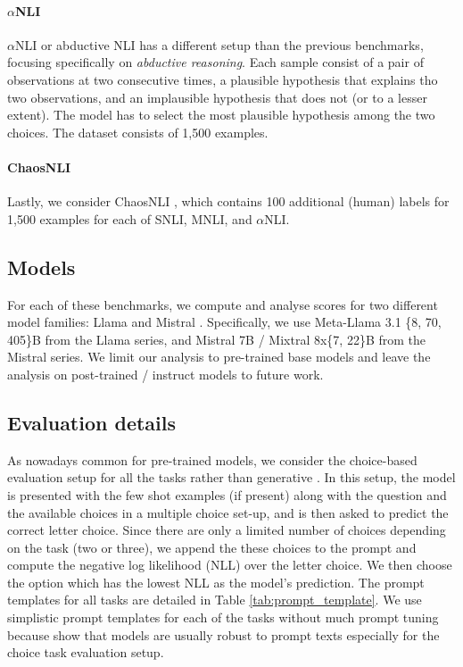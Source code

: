 \vspace{-1mm}
\paragraph{$\alpha$NLI}
$\alpha$NLI or abductive NLI \citep{bhagavatula2020abductive} has a different setup than the previous benchmarks, focusing specifically on \emph{abductive reasoning}.
Each sample consist of a pair of observations at two consecutive times, a plausible hypothesis that explains tho two observations, and an implausible hypothesis that does not (or to a lesser extent).
The model has to select the most plausible hypothesis among the two choices.
The dataset consists of 1,500 examples.

\vspace{-1mm}
\paragraph{ChaosNLI}
Lastly, we consider ChaosNLI \citep{nie-etal-2020-learn}, which contains 100 additional (human) labels for 1,500 examples for each of SNLI, MNLI, and $\alpha$NLI.

\subsection{Models} For each of these benchmarks, we compute and analyse scores for two different model families: Llama \citep{dubey2024llama} and Mistral \citep{jiang2023mistral, jiang2024mixtral}. 
Specifically, we use Meta-Llama 3.1 \{8, 70, 405\}B from the Llama series, and Mistral 7B / Mixtral 8x\{7, 22\}B from the Mistral series.
We limit our analysis to pre-trained base models and leave the analysis on post-trained / instruct models to future work.

\subsection{Evaluation details}
As nowadays common for pre-trained models, we consider the choice-based evaluation setup for all the tasks rather than generative \citep{dubey2024llama,mmluhfleaderboard}. 
In this setup, the model is presented with the few shot examples (if present) along with the question and the available choices in a multiple choice set-up, and is then asked to predict the correct letter choice.
Since there are only a limited number of choices depending on the task (two or three), we append the these choices to the prompt and compute the negative log likelihood (NLL) over the letter choice. 
We then choose the option which has the lowest NLL as the model's prediction. 
The prompt templates for all tasks are detailed in Table \ref{tab:prompt_template}. We use simplistic prompt templates for each of the tasks without much prompt tuning because \citet{dubey2024llama} show that models are usually robust to prompt texts especially for the choice task evaluation setup.

